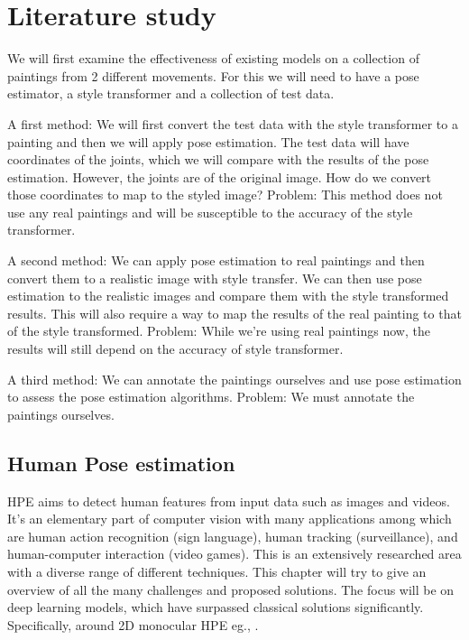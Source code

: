 \chapter{Literature study}
\label{chap:rel_work}

We will first examine the effectiveness of existing models on a collection of paintings from 2 different movements.
For this we will need to have a pose estimator, a style transformer and a collection of test data. 

A first method: We will first convert the test data with the style transformer to a painting and then we will apply pose estimation.
The test data will have coordinates of the joints, which we will compare with the results of the pose estimation.
However, the joints are of the original image. How do we convert those coordinates to map to the styled image? 
Problem: This method does not use any real paintings and will be susceptible to the accuracy of the style transformer.  

A second method: We can apply pose estimation to real paintings and then convert them to a realistic image with style transfer.
We can then use pose estimation to the realistic images and compare them with the style transformed results.
This will also require a way to map the results of the real painting to that of the style transformed. 
Problem: While we’re using real paintings now, the results will still depend on the accuracy of style transformer. 

A third method: We can annotate the paintings ourselves and use pose estimation to assess the pose estimation algorithms. 
Problem: We must annotate the paintings ourselves. 

\section{Human Pose estimation}
\label{sec:hpe}

\gls{HPE} aims to detect human features from input data such as images and videos.
It's an elementary part of computer vision with many applications among which are human action recognition (sign language), human tracking (surveillance), and human-computer interaction (video games).
This is an extensively researched area with a diverse range of different techniques.
This chapter will try to give an overview of all the many challenges and proposed solutions.
The focus will be on deep learning models, which have surpassed classical solutions significantly.
Specifically, around 2D monocular \gls{HPE} eg., \cite{Munea2020}\cite{Zheng2012}\cite{Liu2104}\cite{chen2022}.

